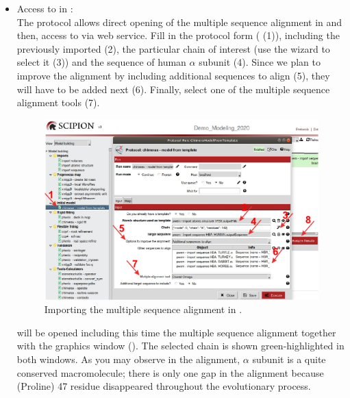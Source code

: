 \begin{itemize}
 \item Access to \modeller in \chimera:\\
 The protocol  allows direct opening of the multiple sequence alignment in \chimera and then, access to \modeller via web service. Fill in the protocol form ( (1)), including the   previously imported (2), the particular chain of interest (use the wizard to select it (3)) and the  sequence of human  $\alpha$ subunit (4). Since we plan to improve the alignment by including additional sequences to align (5), they will have to be added next (6). Finally, select one of the multiple sequence alignment tools (7). 
 
 \begin{figure}[H]
  \centering 
  \captionsetup{width=.9\linewidth} 
  \includegraphics[width=1\textwidth]{Images/Fig13}
  \caption{Importing the multiple sequence alignment in \chimera.}
  \label{fig:model_from_template_protocol}
  \end{figure}
 
 \chimera will be opened including this time the multiple sequence alignment together with the \chimera graphics window (). The  selected chain is shown green-highlighted in both windows. As you may observe in the alignment,  $\alpha$ subunit is a quite conserved macromolecule; there is only one gap in the alignment because  (Proline) 47 residue disappeared throughout the evolutionary process. 
 

\end{itemize}
